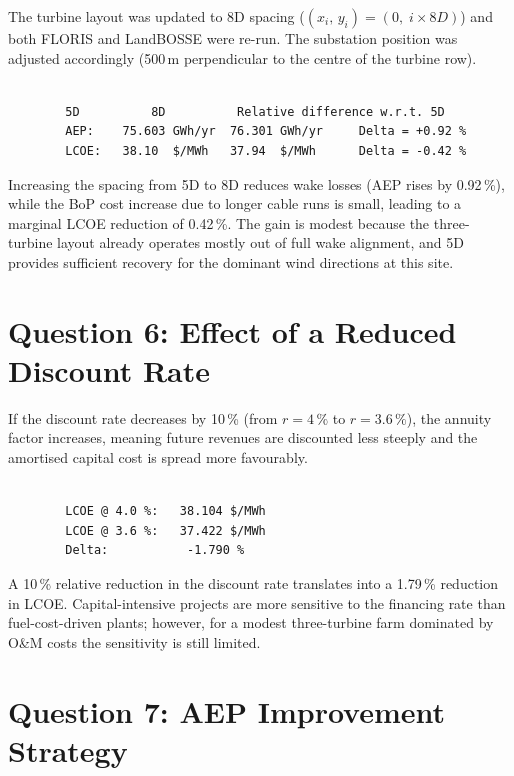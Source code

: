 \documentclass[11pt,a4paper]{article}
\begin{document}
	The turbine layout was updated to 8D spacing
	($(x_i,\,y_i) = (0,\;i\times 8D)$) and both FLORIS and LandBOSSE were
	re-run.  The substation position was adjusted accordingly
	(500\,m perpendicular to the centre of the turbine row).
	
	\begin{lstlisting}
		
		5D          8D          Relative difference w.r.t. 5D
		AEP:    75.603 GWh/yr  76.301 GWh/yr     Delta = +0.92 %
		LCOE:   38.10  $/MWh   37.94  $/MWh      Delta = -0.42 %
	\end{lstlisting}
	
	Increasing the spacing from 5D to 8D reduces wake losses (AEP rises by 0.92\,\%),
	while the BoP cost increase due to longer cable runs is small, leading to a
	marginal LCOE reduction of 0.42\,\%.  The gain is modest because the three-turbine
	layout already operates mostly out of full wake alignment, and 5D provides
	sufficient recovery for the dominant wind directions at this site.
	
	\section{Question 6: Effect of a Reduced Discount Rate}
	
	If the discount rate decreases by 10\,\% (from $r = 4\,\%$ to
	$r = 3.6\,\%$), the annuity factor increases, meaning future revenues are
	discounted less steeply and the amortised capital cost is spread more
	favourably.
	
	\begin{lstlisting}
		
		LCOE @ 4.0 %:   38.104 $/MWh
		LCOE @ 3.6 %:   37.422 $/MWh
		Delta:           -1.790 %
	\end{lstlisting}
	
	A 10\,\% relative reduction in the discount rate translates into a 1.79\,\%
	reduction in LCOE.  Capital-intensive projects are more sensitive to the
	financing rate than fuel-cost-driven plants; however, for a modest three-turbine
	farm dominated by O\&M costs the sensitivity is still limited.
	
	\section{Question 7: AEP Improvement Strategy}
	
\end{document}
